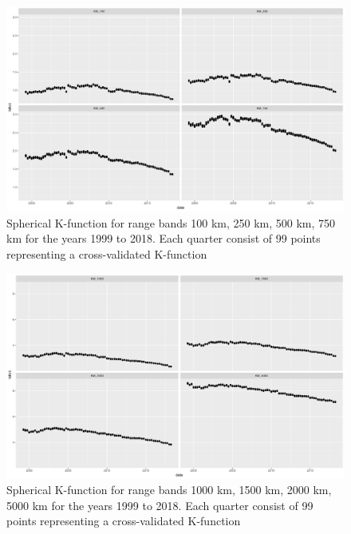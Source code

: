 \begin{figure}[H]
	\centering
	\includegraphics[width=.9\textwidth]{Figures/ChapterIII/RIpley_K_100_750.pdf} 
	\caption[Spherical K-function for Range Bands 100km to 750km]{Spherical K-function for range bands 100 km, 250 km, 500 km, 750 km for the years 1999 to 2018. Each quarter consist of 99 points representing a cross-validated K-function}
	\label{fig:Kfunction100to750}
\end{figure}


\begin{figure}[H]
	\centering
	\includegraphics[width=.9\textwidth]{Figures/ChapterIII/Cross_val_1000_5000.pdf} 
	\caption[Spherical K-function for Range Bands 1000km to 5000km]{Spherical K-function for range bands 1000 km, 1500 km, 2000 km, 5000 km for the years 1999 to 2018. Each quarter consist of 99 points representing a cross-validated K-function}
	\label{fig:Kfunction1000to5000}
\end{figure}

